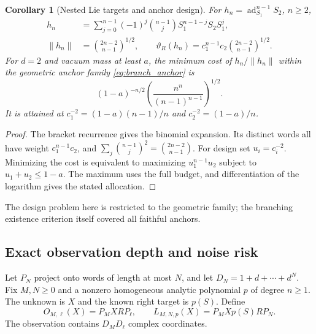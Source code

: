 \documentclass[11pt,a4paper]{amsart}
\numberwithin{equation}{section}
\newtheorem{corollary}[theorem]{Corollary}
\theoremstyle{definition}
\theoremstyle{remark}
\DeclareMathOperator{\ad}{ad}
\newcommand{\norm}[1]{\left\lVert#1\right\rVert}
\begin{document}
\begin{corollary}[Nested Lie targets and anchor design]\label{cor:lie_resource_design}
For $h_n=\ad_{S_1}^{n-1}S_2$, $n\ge2$,
\begin{align}
 h_n&=\sum_{j=0}^{n-1}(-1)^j\binom{n-1}jS_1^{n-1-j}S_2S_1^j,\\
 \norm{h_n}&=\binom{2n-2}{n-1}^{1/2},\qquad
 \vartheta_R(h_n)=c_1^{n-1}c_2\binom{2n-2}{n-1}^{1/2}.
 \label{eq:lie_exact_cost}
\end{align}
For $d=2$ and vacuum mass at least $a$, the minimum cost of $h_n/\norm{h_n}$ within the geometric anchor family \eqref{eq:branch_anchor} is
\begin{equation}\label{eq:lie_design_optimum}
 (1-a)^{-n/2}\left(\frac{n^n}{(n-1)^{n-1}}\right)^{1/2}.
\end{equation}
It is attained at $c_1^{-2}=(1-a)(n-1)/n$ and $c_2^{-2}=(1-a)/n$.
\end{corollary}
\begin{proof}
The bracket recurrence gives the binomial expansion. Its distinct words all have weight $c_1^{n-1}c_2$, and
$\sum_j\binom{n-1}j^2=\binom{2n-2}{n-1}$.
For design set $u_i=c_i^{-2}$. Minimizing the cost is equivalent to maximizing $u_1^{n-1}u_2$ subject to $u_1+u_2\le1-a$. The maximum uses the full budget, and differentiation of the logarithm gives the stated allocation.
\end{proof}
The design problem here is restricted to the geometric family; the branching existence criterion itself covered all faithful anchors.

\subsection{Exact observation depth and noise risk}
Let $P_N$ project onto words of length at most $N$, and let $D_N=1+d+\cdots+d^N$. Fix $M,N\ge0$ and a nonzero homogeneous analytic polynomial $p$ of degree $n\ge1$. The unknown is $X$ and the known right target is $p(S)$. Define
\begin{equation}\label{eq:fock_protocol}
 O_{M,\ell}(X)=P_MXRP_\ell,\qquad
 L_{M,N,p}(X)=P_MXp(S)RP_N.
\end{equation}
The observation contains $D_MD_\ell$ complex coordinates.
\end{document}
